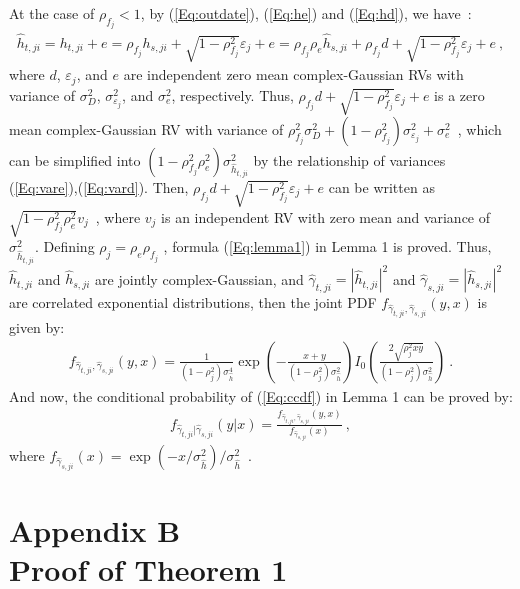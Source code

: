 \documentclass[onecolumn,letterpaper,11pt,draftclsnofoot]{IEEEtran}
\begin{document}
At the case of $\rho_{f_j}<1$, by (\ref{Eq:outdate}), (\ref{Eq:he})
and (\ref{Eq:hd}), we have~:
\begin{align}
\hat h_{t,ji}= h_{t,ji}+e=\rho_{f_j}
h_{s,ji}+\sqrt{1-\rho_{f_j}^2}\varepsilon_j+e=\rho_{f_j}\rho_e \hat
h_{s,ji}+\rho_{f_j}d+\sqrt{1-\rho_{f_j}^2}\varepsilon_j+e~,
\end{align}
where $d$, $\varepsilon_j$, and $e$ are independent zero mean
complex-Gaussian RVs with variance of $\sigma_D^2$,
$\sigma_{\varepsilon_j}^2$, and $\sigma_e^2$, respectively. Thus,
$\rho_{f_j}d+\sqrt{1-\rho_{f_j}^2}\varepsilon_j+e$ is a zero mean
complex-Gaussian RV with variance of
$\rho_{f_j}^2\sigma_D^2+\left(1-\rho_{f_j}^2\right)\sigma_{\varepsilon_j}^2+\sigma_e^2$~,
which can be simplified into
$\left(1-\rho_{f_j}^2\rho_e^2\right)\sigma_{\hat h_{t,ji}}^2$ by the
relationship of variances (\ref{Eq:vare}),(\ref{Eq:vard}). Then,
$\rho_{f_j}d+\sqrt{1-\rho_{f_j}^2}\varepsilon_j+e$ can be written as
$\sqrt{1-\rho_{f_j}^2\rho_e^2}v_j$~, where $v_j$ is an independent
RV with zero mean and variance of $\sigma_{\hat h_{t,ji}}^2$.
Defining $\rho_j=\rho_e\rho_{f_j}$ , formula (\ref{Eq:lemma1}) in
Lemma 1 is proved. Thus, $\hat h_{t,ji}$ and $\hat h_{s,ji}$ are
jointly complex-Gaussian, and $\hat \gamma_{t,ji}=\left|\hat
h_{t,ji}\right|^2$ and $\hat \gamma_{s,ji}=\left|\hat
h_{s,ji}\right|^2 $ are correlated exponential distributions, then
the joint PDF $f_{\hat \gamma_{t,ji} ,\hat \gamma_{s,ji} } \left(
{y,x} \right)$ is given by\cite{Simon}:
\begin{align}
f_{\hat \gamma_{t,ji} ,\hat \gamma_{s,ji} } \left( {y,x} \right) =
\frac{1}{{\left( {1 - \rho _j^2 } \right)\sigma _{\hat h}^4 }}\exp
\left( { - \frac{{x + y}}{{\left( {1 - \rho _j^2 } \right)\sigma
_{\hat h}^2 }}} \right)I_0 \left( {\frac{{2\sqrt {\rho _j^2 xy}
}}{{\left( {1 - \rho _j^2 } \right)\sigma _{\hat h}^2 }}} \right)~.
\end{align}
And now, the conditional probability of (\ref{Eq:ccdf}) in Lemma 1
can be proved by\cite{Paoulis}:
\begin{align}
 f_{\hat \gamma_{t,ji}|\hat
\gamma_{s,ji}} \left( {y|x} \right)=\frac{f_{\hat \gamma_{t,ji}
,\hat \gamma_{s,ji}} \left( {y,x} \right)}{f_{\hat \gamma_{s,ji} }
\left( x \right)}~,
\end{align}
where $f_{\hat \gamma _{s,ji} } \left( x \right) = \exp \left( { -
x/\sigma _{\hat h}^2 } \right)/\sigma _{\hat h}^2 $~.

\section*{Appendix B\\ Proof of Theorem 1}
\end{document}
